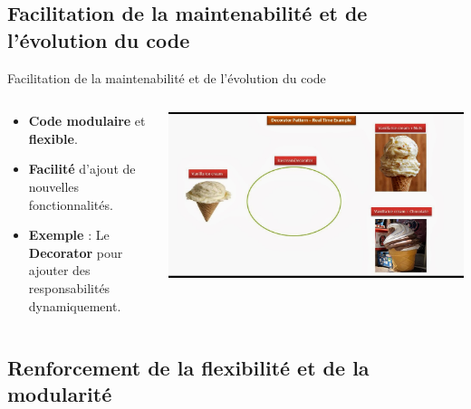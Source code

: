 \documentclass[aspectratio=169]{beamer}
\begin{document}
\subsection{Facilitation de la maintenabilité et de l'évolution du code}
\begin{frame}{Facilitation de la maintenabilité et de l'évolution du code}
    \begin{columns}
        \begin{column}{0.6\textwidth}
            \begin{itemize}
                \item \textbf{Code modulaire} et \textbf{flexible}.
                \item \textbf{Facilité} d'ajout de nouvelles fonctionnalités.
                \pause
                \item \textbf{Exemple} : Le \textbf{Decorator} pour ajouter des responsabilités dynamiquement.
            \end{itemize}
        \end{column}
        \begin{column}{0.4\textwidth}
            \begin{center}
                \includegraphics[width=1.0\textwidth]{pic/decorator_pattern.png}
            \end{center}
        \end{column}
    \end{columns}
\end{frame}
\subsection{Renforcement de la flexibilité et de la modularité}
\end{document}
